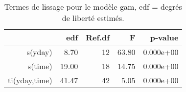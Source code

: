 \begin{table}[!ht]
\centering
\begin{tabular}{rrrrr}
  \hline
 & edf & Ref.df & F & p-value \\ 
  \hline
s(yday) & 8.70 & 12 & 63.80 & 0.000e+00 \\ 
  s(time) & 19.00 & 18 & 14.75 & 0.000e+00 \\ 
  ti(yday,time) & 41.47 & 42 & 5.05 & 0.000e+00 \\ 
   \hline
\end{tabular}
\caption{Termes de lissage pour le modèle gam, edf = degrés de liberté estimés.} 
\label{smpm.st}
\end{table}
